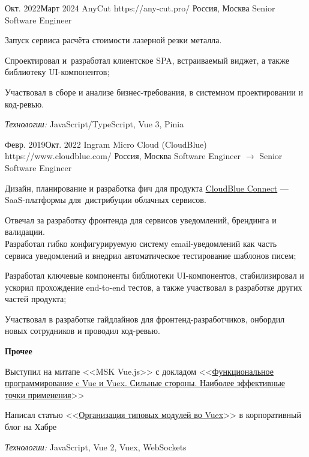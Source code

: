 \documentclass[10pt]{article}
\begin{document}
\job
	{Окт. 2022}{Март 2024}
	{AnyCut}
	{https://any-cut.pro/}
	{Россия, Москва}
	{Senior Software Engineer}
	{
	  Запуск сервиса расчёта стоимости лазерной резки металла.

	  \begin{supercompactitemize}
		\item Спроектировал и~разработал клиентское SPA, встраиваемый виджет, а также библиотеку \mbox{UI-компонентов};
		\item Участвовал в сборе и анализе бизнес-требования, в системном проектировании и код-ревью.
	  \end{supercompactitemize}

	  \textit{Технологии:} JavaScript/TypeScript, Vue 3, Pinia
	}

\job
	{Февр. 2019}{Окт. 2022}
	{Ingram Micro Cloud (CloudBlue)}
	{https://www.cloudblue.com/}
	{Россия, Москва}
	{Software Engineer $\rightarrow$ Senior Software Engineer}
	{
	  Дизайн, планирование и разработка фич для продукта \href{https://connect.cloudblue.com/community/}{CloudBlue Connect} --- SaaS-платформы для~дистрибуции облачных сервисов.

	  \begin{supercompactitemize}
		\item Отвечал за разработку фронтенда для сервисов уведомлений, брендинга и валидации. \\ Разработал гибко конфигурируемую систему email-уведомлений как часть сервиса уведомлений и внедрил автоматическое тестирование шаблонов писем;
		\item Разработал ключевые компоненты библиотеки UI-компонентов, стабилизировал и ускорил прохождение end-to-end тестов, а также участвовал в разработке других частей продукта;
		\item Участвовал в разработке гайдлайнов для фронтенд-разработчиков, онбордил новых сотрудников и проводил код-ревью.
	  \end{supercompactitemize}

	  \textbf{Прочее}

	  \begin{supercompactitemize}
	  	\item Выступил на митапе <<MSK Vue.js>> с докладом <<\href{https://www.youtube.com/watch?v=Rz_RynHNZKg}{Функциональное программирование c Vue и Vuex. Сильные стороны. Наиболее эффективные точки применения}>>
		\item Написал статью <<\href{https://habr.com/ru/company/odin_ingram_micro/blog/526094/}{Организация типовых модулей во Vuex}>> в корпоративный блог на Хабре
	  \end{supercompactitemize}

	  \textit{Технологии:} JavaScript, Vue 2, Vuex, WebSockets
	}
\end{document}
